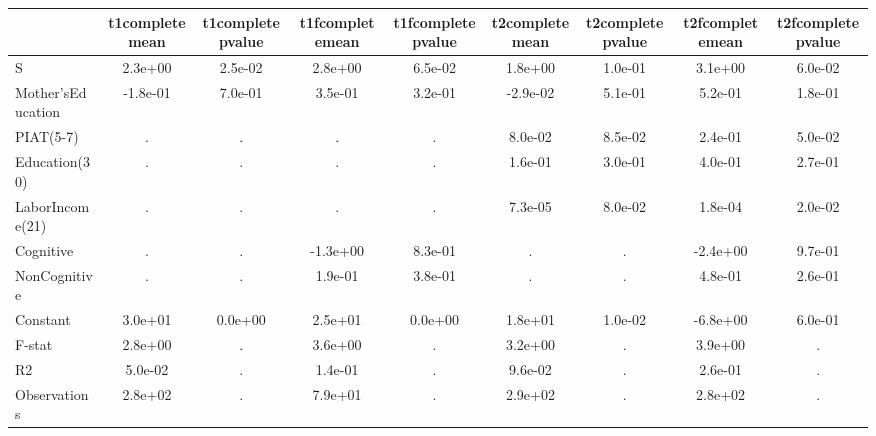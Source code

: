 \begin{table}[htbp]
\begin{tabular}{lcccccccc} \hline \hline
 & t1completemean  & t1completepvalue  & t1fcompletemean  & t1fcompletepvalue  & t2completemean  & t2completepvalue  & t2fcompletemean  & t2fcompletepvalue  \\  \hline 
S &  2.3e+00 &  2.5e-02 &  2.8e+00 &  6.5e-02 &  1.8e+00 &  1.0e-01 &  3.1e+00 &  6.0e-02 \\  
Mother'sEducation & -1.8e-01 &  7.0e-01 &  3.5e-01 &  3.2e-01 & -2.9e-02 &  5.1e-01 &  5.2e-01 &  1.8e-01 \\  
PIAT(5-7) &         . &         . &         . &         . &  8.0e-02 &  8.5e-02 &  2.4e-01 &  5.0e-02 \\  
Education(30) &         . &         . &         . &         . &  1.6e-01 &  3.0e-01 &  4.0e-01 &  2.7e-01 \\  
LaborIncome(21) &         . &         . &         . &         . &  7.3e-05 &  8.0e-02 &  1.8e-04 &  2.0e-02 \\  
Cognitive &         . &         . & -1.3e+00 &  8.3e-01 &         . &         . & -2.4e+00 &  9.7e-01 \\  
NonCognitive &         . &         . &  1.9e-01 &  3.8e-01 &         . &         . &  4.8e-01 &  2.6e-01 \\  
Constant &  3.0e+01 &  0.0e+00 &  2.5e+01 &  0.0e+00 &  1.8e+01 &  1.0e-02 & -6.8e+00 &  6.0e-01 \\  
F-stat &  2.8e+00 &         . &  3.6e+00 &         . &  3.2e+00 &         . &  3.9e+00 &         . \\  
R2 &  5.0e-02 &         . &  1.4e-01 &         . &  9.6e-02 &         . &  2.6e-01 &         . \\  
Observations &  2.8e+02 &         . &  7.9e+01 &         . &  2.9e+02 &         . &  2.8e+02 &         . \\  
\hline \hline \end{tabular}
\end{table}
